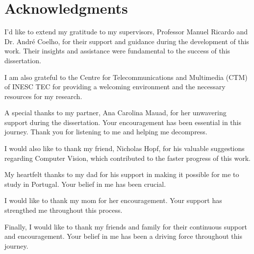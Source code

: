 \chapter*{Acknowledgments}


\vspace{10mm}
I'd like to extend my gratitude to my supervisors, Professor Manuel Ricardo and Dr. André Coelho, for their support and guidance during the development of this work. Their insights and assistance were fundamental to the success of this dissertation.

I am also grateful to the Centre for Telecommunications and Multimedia (CTM) of INESC TEC for providing a welcoming environment and the necessary resources for my research.

A special thanks to my partner, Ana Carolina Mauad, for her unwavering support during the dissertation. Your encouragement has been essential in this journey. Thank you for listening to me and helping me decompress.

I would also like to thank my friend, Nicholas Hopf, for his valuable suggestions regarding Computer Vision, which contributed to the faster progress of this work.

My heartfelt thanks to my dad for his support in making it possible for me to study in Portugal. Your belief in me has been crucial.

I would like to thank my mom for her encouragement. Your support has strengthed me throughout this process.

Finally, I would like to thank my friends and family for their continuous support and encouragement. Your belief in me has been a driving force throughout this journey.


